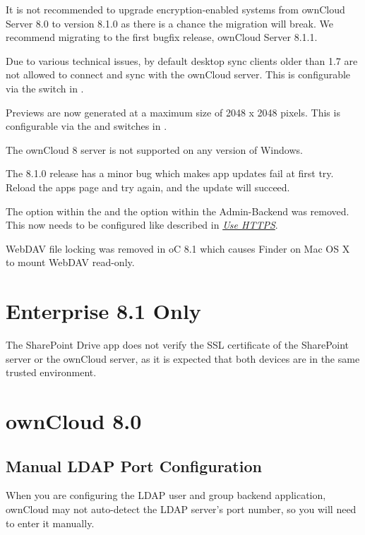 \documentclass[letterpaper,10pt,english]{sphinxmanual}
\begin{document}
It is not recommended to upgrade encryption-enabled systems from ownCloud Server 8.0
to version 8.1.0 as there is a chance the migration will break. We recommend
migrating to the first bugfix release, ownCloud Server 8.1.1.

Due to various technical issues, by default desktop sync clients older than
1.7 are not allowed to connect and sync with the ownCloud server. This is
configurable via the  switch in
.

Previews are now generated at a maximum size of 2048 x 2048 pixels. This is configurable
via the  and  switches in .

The ownCloud 8 server is not supported on any version of Windows.

The 8.1.0 release has a minor bug which makes app updates fail at first try. Reload the
apps page and try again, and the update will succeed.

The  option within the  and the  option
within the Admin-Backend was removed. This now needs to be configured like
described in {\hyperref[configuration_server/harden_server:use-https-label]{\emph{Use HTTPS}}}.

WebDAV file locking was removed in oC 8.1 which causes Finder on Mac OS X to mount WebDAV read-only.


\section{Enterprise 8.1 Only}
\label{release_notes:enterprise-8-1-only}
The SharePoint Drive app does not verify the SSL certificate of the SharePoint
server or the ownCloud server, as it is expected that both devices are in the
same trusted environment.


\section{ownCloud 8.0}
\label{release_notes:owncloud-8-0}

\subsection{Manual LDAP Port Configuration}
\label{release_notes:manual-ldap-port-configuration}
When you are configuring the LDAP user and group backend application, ownCloud
may not auto-detect the LDAP server's port number, so you will need to enter it
manually.
\end{document}

